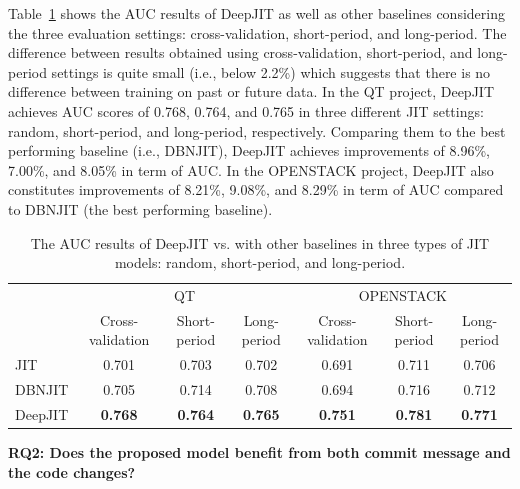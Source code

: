 Table~\ref{tab:results} shows the AUC results of DeepJIT as well as other baselines considering the three evaluation settings: cross-validation, short-period, and long-period. The difference between results obtained using cross-validation, short-period, and long-period settings is quite small (i.e., below 2.2\%) which suggests that there is no difference between training on past or future data. 
In the QT project, DeepJIT achieves AUC scores of 0.768, 0.764, and 0.765 in three different JIT settings: random, short-period, and long-period, respectively. Comparing them to the best performing baseline (i.e., DBNJIT), DeepJIT achieves improvements of 8.96\%, 7.00\%, and 8.05\% in term of AUC. In the OPENSTACK project, DeepJIT also constitutes improvements of 8.21\%, 9.08\%, and 8.29\% in term of AUC compared to DBNJIT (the best performing baseline). 

\begin{table}[t!]
	\centering
	\caption{The AUC results of DeepJIT vs. with other baselines in three types of JIT models: random, short-period, and long-period.}
	\begin{tabular}{|l|c|c|c|c|c|c|}
		\hline
		\multirow{2}[4]{*}{} & \multicolumn{3}{c|}{QT} & \multicolumn{3}{c|}{OPENSTACK} \\
		\cline{2-7}          & Cross-validation & Short-period & Long-period & Cross-validation & Short-period & Long-period \\
		\hline
		\hline
		JIT   & 0.701 & 0.703 & 0.702 & 0.691 & 0.711 & 0.706 \\
		\hline
		DBNJIT & 0.705 & 0.714 & 0.708 & 0.694 & 0.716 & 0.712 \\
		\hline
		DeepJIT & \textbf{0.768} & \textbf{0.764} & \textbf{0.765} & \textbf{0.751} & \textbf{0.781} & \textbf{0.771} \\
		\hline
	\end{tabular}%
	\label{tab:results}%
\end{table}%

\noindent \textbf{RQ2: Does the proposed model benefit from both commit message and the code changes?}

